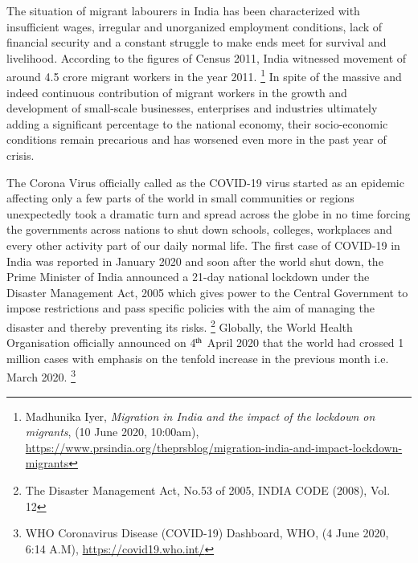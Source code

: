 \setcounter{figure}{0}
\setcounter{table}{0}
\setcounter{footnote}{0}




\begin{multicols}{2}



\noi
The situation of migrant labourers in India has been characterized with insufficient wages,
irregular and unorganized employment conditions, lack of financial security and a constant
struggle to make ends meet for survival and livelihood. According to the figures of Census
2011, India witnessed movement of around 4.5 crore migrant workers in the year 2011. \footnote{Madhunika Iyer, \textit{Migration in India and the impact of the lockdown on migrants}, (10 June 2020, 10:00am),
\url{https://www.prsindia.org/theprsblog/migration-india-and-impact-lockdown-migrants}}
 In
spite of the massive and indeed continuous contribution of migrant workers in the growth and
development of small-scale businesses, enterprises and industries ultimately adding a
significant percentage to the national economy, their socio-economic conditions remain
precarious and has worsened even more in the past year of crisis.

\noi
The Corona Virus officially called as the COVID-19 virus started as an epidemic affecting
only a few parts of the world in small communities or regions unexpectedly took a dramatic
turn and spread across the globe in no time forcing the governments across nations to shut
down schools, colleges, workplaces and every other activity part of our daily normal life. The
first case of COVID-19 in India was reported in January 2020 and soon after the world shut
down, the Prime Minister of India announced a 21-day national lockdown under the Disaster
Management Act, 2005 which gives power to the Central Government to impose restrictions
and pass specific policies with the aim of managing the disaster and thereby preventing its
risks. \footnote{The Disaster Management Act, No.53 of 2005, INDIA CODE (2008), Vol. 12}
 Globally, the World Health Organisation officially announced on 4$^{\rm th}$ April 2020 that
the world had crossed 1 million cases with emphasis on the tenfold increase in the previous
month i.e. March 2020. \footnote{WHO Coronavirus Disease (COVID-19) Dashboard, WHO, (4 June 2020, 6:14 A.M), \url{https://covid19.who.int/}}


\end{multicols}
